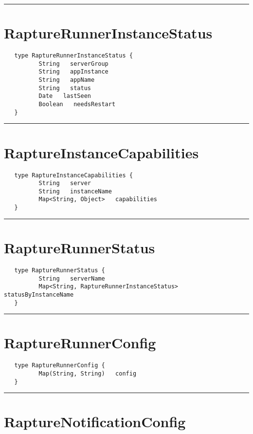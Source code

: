 \rule{12cm}{2pt}
\section{RaptureRunnerInstanceStatus}
\label{type:RaptureRunnerInstanceStatus}

\begin{verbatim}
   type RaptureRunnerInstanceStatus {
          String   serverGroup
          String   appInstance
          String   appName
          String   status
          Date   lastSeen
          Boolean   needsRestart
   }
\end{verbatim}

\rule{12cm}{2pt}
\section{RaptureInstanceCapabilities}
\label{type:RaptureInstanceCapabilities}

\begin{verbatim}
   type RaptureInstanceCapabilities {
          String   server
          String   instanceName
          Map<String, Object>   capabilities
   }
\end{verbatim}

\rule{12cm}{2pt}
\section{RaptureRunnerStatus}
\label{type:RaptureRunnerStatus}

\begin{verbatim}
   type RaptureRunnerStatus {
          String   serverName
          Map<String, RaptureRunnerInstanceStatus>   statusByInstanceName
   }
\end{verbatim}

\rule{12cm}{2pt}
\section{RaptureRunnerConfig}
\label{type:RaptureRunnerConfig}

\begin{verbatim}
   type RaptureRunnerConfig {
          Map(String, String)   config
   }
\end{verbatim}

\rule{12cm}{2pt}
\section{RaptureNotificationConfig}
\label{type:RaptureNotificationConfig}

